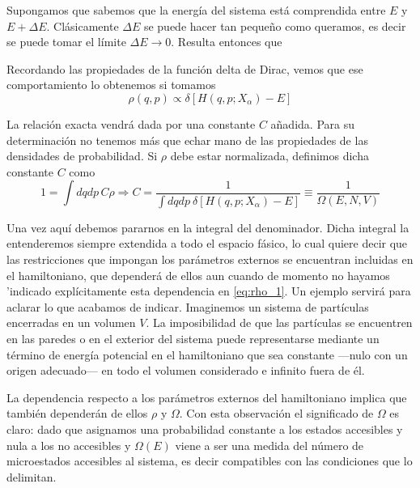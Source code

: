 Supongamos que sabemos que la energía del sistema está comprendida entre $E$ y $E + \Delta E$.
Clásicamente $\Delta E$ se puede hacer tan pequeño como queramos, es decir se puede tomar el límite $\Delta E \rightarrow 0$.
Resulta entonces que 
\vspace{-10pt}
\begin{center}
\end{center}

Recordando las propiedades de la función delta de Dirac, vemos que ese comportamiento lo obtenemos si tomamos
\begin{equation}\label{eq:rho_1}
	\rho(q,p) \propto \delta \left[ H(q,p;X_\alpha) - E \right] 
\end{equation}

La relación exacta vendrá dada por una constante $C$ añadida.
Para su determinación no tenemos más que echar mano de las propiedades de las densidades de probabilidad.
Si $\rho$ debe estar normalizada, definimos dicha constante $C$ como
\begin{equation}\label{eq:Omega_t1}
	1 = \int dq dp \, C \rho \Rightarrow C = \frac{1}{\int dq dp \ \delta \left[ H(q,p;X_\alpha) - E \right]} \equiv \frac{1}{\Omega(E,N,V)} 
\end{equation}

Una vez aquí debemos pararnos en la integral del denominador. Dicha integral la entenderemos siempre extendida a todo el espacio fásico, lo cual quiere decir que las restricciones que impongan los parámetros externos se encuentran incluidas en el hamiltoniano, que dependerá de ellos aun cuando de momento no hayamos 'indicado explícitamente esta dependencia en \eqref{eq:rho_1}.
Un ejemplo servirá para aclarar lo que acabamos de indicar.
Imaginemos un sistema de partículas encerradas en un volumen $V$.
La imposibilidad de que las partículas se encuentren en las paredes o en el exterior del sistema puede representarse mediante un término de energía potencial en el hamiltoniano que sea constante ---nulo con un origen adecuado--- en todo el volumen considerado e infinito fuera de él.

La dependencia respecto a los parámetros externos del hamiltoniano implica que también dependerán de ellos $\rho$ y $\Omega$. Con esta observación el significado de $\Omega$ es claro: dado que asignamos una probabilidad constante a los estados accesibles y nula a los no accesibles y $\Omega(E)$ viene a ser una medida del número de microestados accesibles al sistema, es decir compatibles con las condiciones que lo delimitan.

